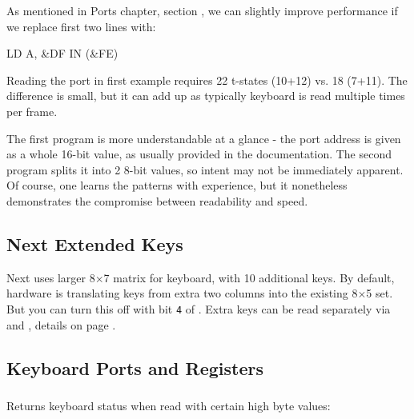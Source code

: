 As mentioned in Ports chapter, section , we can slightly improve performance if we replace first two lines with:

\begin{tcblisting}{}
	LD A, &DF
	IN (&FE)
\end{tcblisting}

Reading the port in first example requires 22 t-states (10+12) vs. 18 (7+11). The difference is small, but it can add up as typically keyboard is read multiple times per frame.

The first program is more understandable at a glance - the port address is given as a whole 16-bit value, as usually provided in the documentation. The second program splits it into 2 8-bit values, so intent may not be immediately apparent. Of course, one learns the patterns with experience, but it nonetheless demonstrates the compromise between readability and speed.


\subsection{Next Extended Keys}

Next uses larger 8$\times$7 matrix for keyboard, with 10 additional keys. By default, hardware is translating keys from extra two columns into the existing 8$\times$5 set. But you can turn this off with bit {\tt 4} of . Extra keys can be read separately via  and , details on page .


\subsection{Keyboard Ports and Registers}
\label{zx_next_keyboard_registers}

\subsubsection{}

\vspace*{-1em} %
Returns keyboard status when read with certain high byte values:

